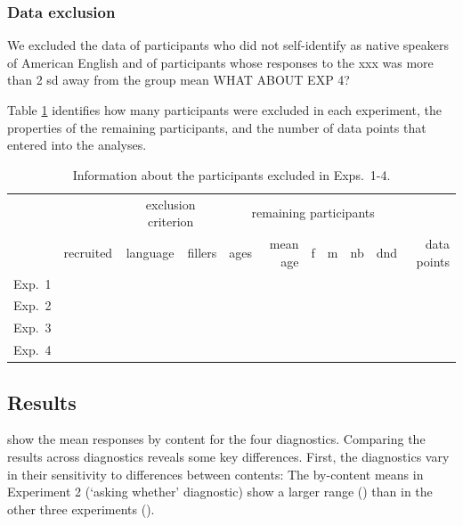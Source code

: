 \documentclass[12pt]{article}
\begin{document}
\subsubsection{Data exclusion}

We excluded the data of participants who did not self-identify as native speakers of
American English and of participants whose responses to the xxx was more than 2 sd away from the group mean WHAT ABOUT EXP 4?

Table \ref{t:excluded} identifies how many participants were excluded in each experiment, the properties of the remaining participants, and the number of data points that entered into the analyses.

\begin{table}[h!]
\centering
\begin{tabular}{l r | r r | r r r r r r | r}
             & & \multicolumn{2}{c}{exclusion criterion} & \multicolumn{6}{c}{remaining participants} & \\ 
            & recruited & language & fillers & ages & mean age & f & m & nb & dnd & data points \\ \hline
Exp.~1 &  &  &  &  &  &  & &  & & \\ 
Exp.~2 &  &  &  &  &  &  & &  & & \\ 
Exp.~3 &  &  &  &  &  &  & &  & & \\ 
Exp.~4 &  &  &  &  &  &  & &  & & \\ 
\hline
\end{tabular}
\caption{Information about the participants excluded in Exps.~1-4.}\label{t:excluded}
\end{table}

  \subsection{Results}
  
   show the mean responses by content for the four diagnostics. Comparing the results across diagnostics reveals some key differences.
    First, the diagnostics vary in their sensitivity to differences between contents: The by-content means in Experiment 2 (`asking whether' diagnostic) show a larger range () than in the other three experiments ().
    
\end{document}
